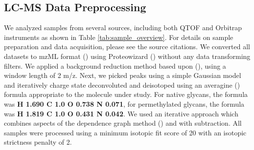 \subsection{LC-MS Data Preprocessing}
    We analyzed samples from several sources, including both QTOF and Orbitrap
    instruments as shown in Table \ref{tab:sample_overview}. For details on sample preparation
    and data acquisition, please see the source citations. We converted all
    datasets to mzML format (\cite{Martens2011}) using Proteowizard
    (\cite{Kessner2008}) without any data transforming filters. We applied a background reduction
    method based upon (\cite{Kaur2006}), using a window length of 2 m/z. Next, we picked peaks using
    a simple Gaussian model and iteratively charge state deconvoluted and deisotoped using an
    averagine (\cite{Senko1995}) formula appropriate to the molecule under study. For native
    glycans, the formula was \textbf{H 1.690 C 1.0 O 0.738 N 0.071}, for permethylated glycans,
    the formula was \textbf{H 1.819 C 1.0 O 0.431 N 0.042}. We used an iterative approach which combines
    aspects of the dependence graph method (\cite{Liu2010}) and with subtraction. All samples
    were processed using a minimum isotopic fit score of 20 with an isotopic strictness penalty
    of 2.

